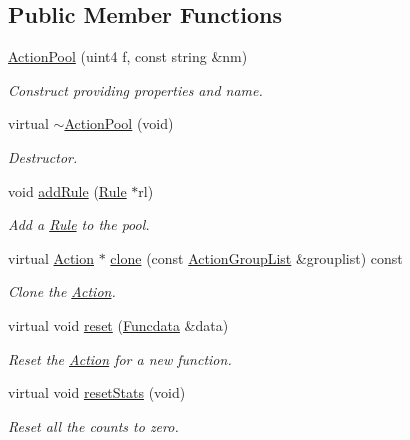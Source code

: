 \subsection*{Public Member Functions}
\begin{DoxyCompactItemize}
\item 
\mbox{\hyperlink{class_action_pool_a050edf2dac4b4a89581615b8432b903e}{Action\+Pool}} (uint4 f, const string \&nm)
\begin{DoxyCompactList}\small\item\em Construct providing properties and name. \end{DoxyCompactList}\item 
virtual \mbox{\hyperlink{class_action_pool_a57593c805f7486f07eeb40598e814700}{$\sim$\+Action\+Pool}} (void)
\begin{DoxyCompactList}\small\item\em Destructor. \end{DoxyCompactList}\item 
void \mbox{\hyperlink{class_action_pool_af8879782eac5bfb2cb748dda52760e12}{add\+Rule}} (\mbox{\hyperlink{class_rule}{Rule}} $\ast$rl)
\begin{DoxyCompactList}\small\item\em Add a \mbox{\hyperlink{class_rule}{Rule}} to the pool. \end{DoxyCompactList}\item 
virtual \mbox{\hyperlink{class_action}{Action}} $\ast$ \mbox{\hyperlink{class_action_pool_a96a6ada9201cdf36d2ed452d0c831725}{clone}} (const \mbox{\hyperlink{class_action_group_list}{Action\+Group\+List}} \&grouplist) const
\begin{DoxyCompactList}\small\item\em Clone the \mbox{\hyperlink{class_action}{Action}}. \end{DoxyCompactList}\item 
virtual void \mbox{\hyperlink{class_action_pool_a63d93ad40b2066b0ad88fc83ee50c8e6}{reset}} (\mbox{\hyperlink{class_funcdata}{Funcdata}} \&data)
\begin{DoxyCompactList}\small\item\em Reset the \mbox{\hyperlink{class_action}{Action}} for a new function. \end{DoxyCompactList}\item 
virtual void \mbox{\hyperlink{class_action_pool_aef3e6dfc90703230f5f4e3fcdc626984}{reset\+Stats}} (void)
\begin{DoxyCompactList}\small\item\em Reset all the counts to zero. \end{DoxyCompactList}\item 

\end{DoxyCompactItemize}
